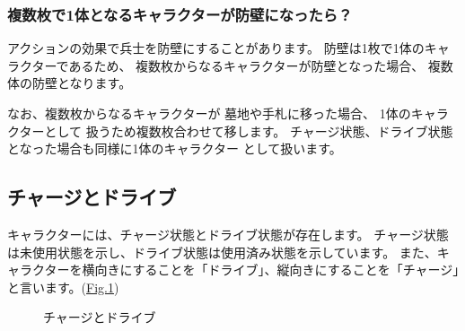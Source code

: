 \documentclass[letterpaper,10pt,dvipdfmx]{sphinxmanual}
\begin{document}
\subsubsection{複数枚で1体となるキャラクターが防壁になったら？}
\label{\detokenize{common/common:id14}}
\sphinxAtStartPar
アクションの効果で兵士を防壁にすることがあります。
防壁は1枚で1体のキャラクターであるため、
複数枚からなるキャラクターが防壁となった場合、
複数体の防壁となります。

\sphinxAtStartPar
なお、複数枚からなるキャラクターが
墓地や手札に移った場合、
1体のキャラクターとして
扱うため複数枚合わせて移します。
チャージ状態、ドライブ状態となった場合も同様に1体のキャラクター
として扱います。

\ignorespaces 

\subsection{チャージとドライブ}
\label{\detokenize{common/common:index-12}}\label{\detokenize{common/common:id15}}
\sphinxAtStartPar
キャラクターには、チャージ状態とドライブ状態が存在します。
チャージ状態は未使用状態を示し、ドライブ状態は使用済み状態を示しています。
また、キャラクターを横向きにすることを「ドライブ」、縦向きにすることを「チャージ」と言います。(\hyperref[\detokenize{common/common:chargedrive}]{Fig.\@ \ref{\detokenize{common/common:chargedrive}}})

\begin{figure}[htbp]
\centering
\capstart

\noindent{}
\caption{チャージとドライブ}\label{\detokenize{common/common:id53}}\label{\detokenize{common/common:chargedrive}}\end{figure}
\end{document}
